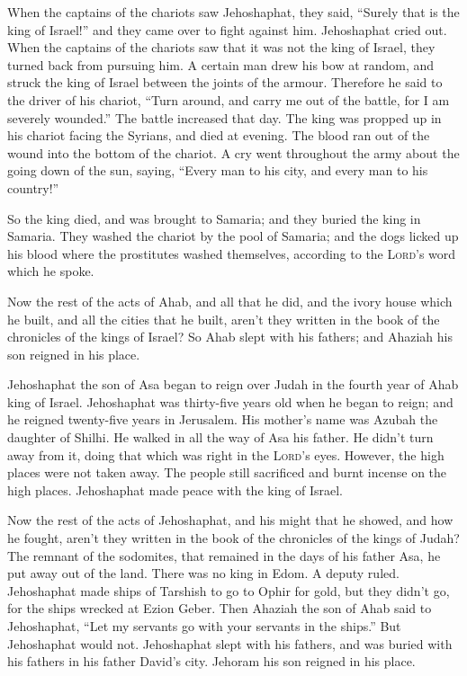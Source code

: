 When the captains of the chariots saw Jehoshaphat, they
said, ``Surely that is the king of Israel!'' and they came over to fight
against him. Jehoshaphat cried out.  When the captains of
the chariots saw that it was not the king of Israel, they turned back
from pursuing him.  A certain man drew his bow at random,
and struck the king of Israel between the joints of the armour.
Therefore he said to the driver of his chariot, ``Turn around, and carry
me out of the battle, for I am severely wounded.''  The
battle increased that day. The king was propped up in his chariot facing
the Syrians, and died at evening. The blood ran out of the wound into
the bottom of the chariot.  A cry went throughout the
army about the going down of the sun, saying, ``Every man to his city,
and every man to his country!''

 So the king died, and was brought to Samaria; and they
buried the king in Samaria.  They washed the chariot by
the pool of Samaria; and the dogs licked up his blood where the
prostitutes washed themselves, according to the \textsc{Lord}'s word
which he spoke.

 Now the rest of the acts of Ahab, and all that he did,
and the ivory house which he built, and all the cities that he built,
aren't they written in the book of the chronicles of the kings of
Israel?  So Ahab slept with his fathers; and Ahaziah his
son reigned in his place.

 Jehoshaphat the son of Asa began to reign over Judah in
the fourth year of Ahab king of Israel.  Jehoshaphat was
thirty-five years old when he began to reign; and he reigned twenty-five
years in Jerusalem. His mother's name was Azubah the daughter of Shilhi.
 He walked in all the way of Asa his father. He didn't
turn away from it, doing that which was right in the \textsc{Lord}'s
eyes. However, the high places were not taken away. The people still
sacrificed and burnt incense on the high places. 
Jehoshaphat made peace with the king of Israel.

 Now the rest of the acts of Jehoshaphat, and his might
that he showed, and how he fought, aren't they written in the book of
the chronicles of the kings of Judah?  The remnant of the
sodomites, that remained in the days of his father Asa, he put away out
of the land.  There was no king in Edom. A deputy ruled.
 Jehoshaphat made ships of Tarshish to go to Ophir for
gold, but they didn't go, for the ships wrecked at Ezion Geber.
 Then Ahaziah the son of Ahab said to Jehoshaphat, ``Let
my servants go with your servants in the ships.'' But Jehoshaphat would
not.  Jehoshaphat slept with his fathers, and was buried
with his fathers in his father David's city. Jehoram his son reigned in
his place.

